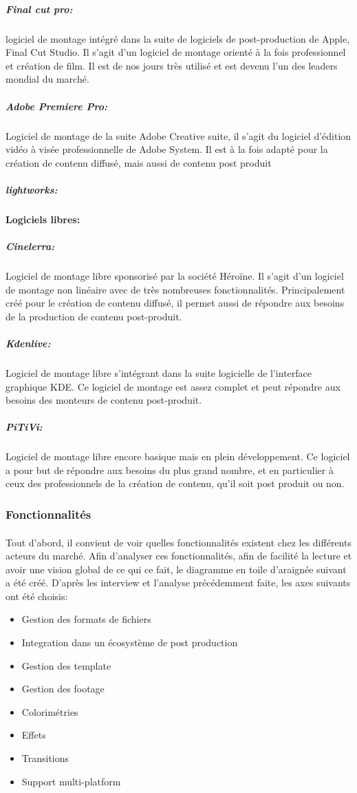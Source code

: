 \subparagraph{Final cut pro:}
logiciel de montage intégré dans la suite de logiciels de post-production
de Apple, Final Cut Studio. Il s'agit d'un logiciel de montage orienté à la fois
professionnel et création de film. Il est de nos jours très utilisé et est devenu l'un
des leaders mondial du marché.

\subparagraph{Adobe Premiere Pro:}
Logiciel de montage de la suite Adobe Creative suite, il s'agit du logiciel
d'édition vidéo à visée professionnelle de Adobe System. Il est à la fois adapté pour la création
de contenu diffusé, mais aussi de contenu post produit

\subparagraph{lightworks:}


\paragraph {Logiciels libres:}

\subparagraph{Cinelerra:}
Logiciel de montage libre sponsorisé par la société Héroïne. Il s'agit d'un logiciel
de montage non linéaire avec de très nombreuses fonctionnalités. Principalement créé pour le création de contenu
diffusé, il permet aussi de répondre aux besoins de la production de contenu post-produit.

\subparagraph{Kdenlive:}
Logiciel de montage libre s'intégrant dans la suite logicielle de l'interface graphique KDE.
Ce logiciel de montage est assez complet et peut répondre aux besoins des monteurs de contenu post-produit.

\subparagraph{PiTiVi:}
Logiciel de montage libre encore basique mais en plein développement.
Ce logiciel a pour but de répondre aux besoins du plus grand nombre,
et en particulier à ceux des professionnels de la création de contenu,
qu'il soit post produit ou non.


\subsubsection{Fonctionnalités}
  \paragraph{}
  Tout d'abord, il convient de voir quelles fonctionnalités existent chez les différents
  acteurs du marché. Afin d'analyser ces fonctionnalités, afin de facilité la lecture et
  avoir une vision global de ce qui ce fait, le diagramme en toile d'araignée suivant a été créé.
  D'après les interview et l'analyse précédemment faite, les axes suivants ont été choisis:
  \begin {itemize}
    \item{Gestion des formats de fichiers}
    \item{Integration dans un écosystème de post production}
    \item{Gestion des template}
    \item{Gestion des footage}
    \item{Colorimétries}
    \item{Effets}
    \item{Transitions}
    \item{Support multi-platform}
  \end {itemize}

